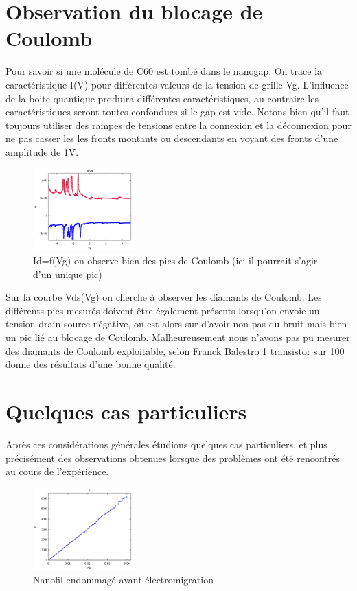 \section{Observation du blocage de Coulomb}
Pour savoir si une molécule de C60 est tombé dans le nanogap, On trace la caractéristique I(V) pour différentes valeurs de la tension de grille Vg. L’influence de la boite quantique produira différentes caractéristiques, au contraire les caractéristiques seront toutes confondues si le gap est vide.
 Notons bien qu’il faut toujours utiliser des rampes de tensions entre la connexion et la déconnexion pour ne pas casser les les fronts montants ou descendants en voyant des fronts d’une amplitude de 1V.
 \begin{figure}[h]
    \begin{center}
        \includegraphics[width=150px]{Images/Image_Blocage_Coulomb_1.png}
        \caption{Id=f(Vg) on observe bien des pics de Coulomb (ici il pourrait s’agir d’un unique pic)}
        \label{fig:}
    \end{center}
\end{figure}
Sur la courbe Vds(Vg) on cherche à observer les diamants de Coulomb. Les différents pics mesurés doivent être également présents lorsqu’on envoie un tension drain-source négative, on est alors sur d’avoir non pas du bruit mais bien un pic lié au blocage de Coulomb.
Malheureusement nous n’avons pas pu mesurer des diamants de Coulomb exploitable, selon Franck Balestro 1 transistor sur 100 donne des résultats d’une bonne qualité.

\section{Quelques cas particuliers}
Après ces considérations générales étudions quelques cas particuliers, et plus précisément des observations obtenues lorsque des problèmes ont été rencontrés au cours de l’expérience.
 \begin{figure}[h]
    \begin{center}
        \includegraphics[width=150px]{Images/Nanofil_Emdommage.png}
        \caption{Nanofil endommagé avant électromigration}
        \label{fig:}
    \end{center}
\end{figure}

